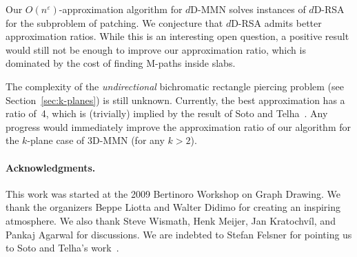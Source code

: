 \documentclass[11pt]{llncs}
\newcommand{\eps}{\ensuremath{\varepsilon}\xspace}
\begin{document}
Our $O(n^{\eps})$-approximation algorithm for $d$D-MMN solves
instances of $d$D-RSA for the subproblem of patching.  We conjecture that
$d$D-RSA admits better approximation ratios.  While this is an interesting open
question, a positive result would still not be enough to improve our
approximation ratio, which is dominated by the cost of finding M-paths
inside slabs.

The complexity of the \emph{undirectional} bichromatic rectangle
piercing problem (see Section~\ref{sec:k-planes}) is still unknown.
Currently, the best 
approximation has a ratio of~4, which is (trivially) 
implied by the
result of Soto and Telha~\cite{st-2dorg-11}.  Any progress would
immediately improve the approximation ratio of our algorithm for the
$k$-plane case of 3D-MMN (for any $k>2$).


\paragraph*{Acknowledgments.}
This work was started at the 2009 Bertinoro
Workshop on Graph Drawing.  We thank the organizers Beppe Liotta and
Walter Didimo for creating an inspiring atmosphere.  We also thank
Steve Wismath, Henk Meijer, Jan Kratochv{\'i}l, and Pankaj Agarwal for
discussions.  We are indebted to Stefan Felsner for pointing us to
Soto and Telha's work~\cite{st-2dorg-11}.  
\end{document}

